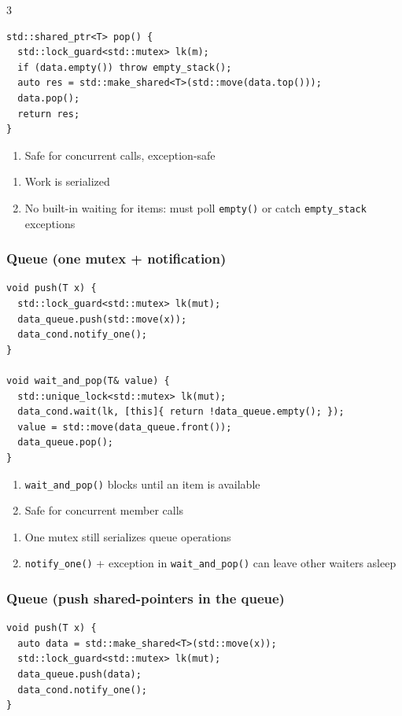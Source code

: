 \documentclass[12pt, a4paper]{article}
\begin{document}
\begin{multicols*}{3}
\begin{lstlisting}[basicstyle=\ttfamily\scriptsize]
std::shared_ptr<T> pop() {
  std::lock_guard<std::mutex> lk(m);
  if (data.empty()) throw empty_stack();
  auto res = std::make_shared<T>(std::move(data.top()));
  data.pop();
  return res;
}
\end{lstlisting}\vspace{-1em}
\begin{enumerate}[$+$]
  \item Safe for concurrent calls, exception-safe
\end{enumerate}
\begin{enumerate}[$-$]\vspace{-2pt}
  \item Work is serialized
  \item No built-in waiting for items: must poll \lstinline|empty()| or catch \lstinline|empty_stack| exceptions
\end{enumerate}

\subsubsection{Queue (one mutex + notification)}
\begin{lstlisting}[basicstyle=\ttfamily\scriptsize]
void push(T x) {
  std::lock_guard<std::mutex> lk(mut);
  data_queue.push(std::move(x));
  data_cond.notify_one();
}

void wait_and_pop(T& value) {
  std::unique_lock<std::mutex> lk(mut);
  data_cond.wait(lk, [this]{ return !data_queue.empty(); });
  value = std::move(data_queue.front());
  data_queue.pop();
}
\end{lstlisting}\vspace{-1em}
\begin{enumerate}[$+$]
  \item \lstinline|wait_and_pop()| blocks until an item is available
  \item Safe for concurrent member calls
\end{enumerate}
\begin{enumerate}[$-$]\vspace{-2pt}
  \item One mutex still serializes queue operations
  \item \lstinline|notify_one()| + exception in \lstinline|wait_and_pop()| can leave other waiters asleep
\end{enumerate}
\colbreak
\subsubsection{Queue (push shared-pointers in the queue)}
\begin{lstlisting}[basicstyle=\ttfamily\scriptsize]
void push(T x) {
  auto data = std::make_shared<T>(std::move(x));
  std::lock_guard<std::mutex> lk(mut);
  data_queue.push(data);
  data_cond.notify_one();
}


\end{lstlisting}
\end{multicols*}
\end{document}
